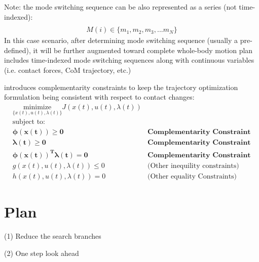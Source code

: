 \documentclass[a4paper,10pt]{article}
\begin{document}
\vspace{3mm}

Note: the mode switching sequence can be also represented as a series (not time-indexed):
\begin{align}
\\ M(i) \in \{m_1,m_2,m_3,...m_N\}
\end{align}
In this case scenario, after determining mode switching sequence (usually a pre-defined), it will be further augmented toward complete whole-body motion plan includes time-indexed mode switching sequences along with continuous variables (i.e. contact forces, CoM trajectory, etc.)




\cite{posa2014direct} introduces complementarity constraints to keep the trajectory optimization formulation being consistent with respect to contact changes:
\begin{align}
& \underset{\{x(t),u(t),\lambda(t)\}}{\text{minimize}} J(x(t), u(t), \lambda(t)) \nonumber \\
& \text{subject to:} \nonumber \\
& \mathbf{\phi(x(t)) \geq 0} & \textbf{Complementarity Constraint 1}\\
& \mathbf{\lambda(t) \geq 0} & \textbf{Complementarity Constraint 2}\\
& \mathbf{\phi(x(t))^T\lambda(t) = 0} & \textbf{Complementarity Constraint 3}\\
& g(x(t), u(t), \lambda(t)) \leq 0 & \text{(Other inequility constraints)} \nonumber \\
& h(x(t), u(t), \lambda(t)) = 0 & \text{(Other equality Constraints)}
\label{eq:genearl_optimization_problem}
\end{align}

\section{Plan}

(1) Reduce the search branches

(2) One step look ahead

\medskip
\newpage

\end{document}
